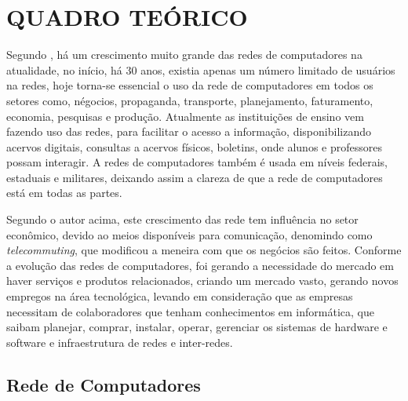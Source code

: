
\chapter{QUADRO TEÓRICO}


\par Segundo , há um crescimento muito grande das redes
de computadores na atualidade, no início, há 30 anos, existia apenas um número
limitado de usuários na redes, hoje torna-se essencial o uso da rede de
computadores em todos os setores como, négocios, propaganda, transporte,
planejamento, faturamento, economia, pesquisas e produção. Atualmente as
instituições de ensino vem fazendo uso das redes, para facilitar o acesso a
informação, disponibilizando acervos digitais, consultas a acervos físicos,
boletins, onde alunos e professores possam interagir. A redes de computadores
também é usada em níveis federais, estaduais e militares, deixando assim a
clareza de que a rede de computadores está em todas as partes.


\par Segundo o autor acima, este crescimento das rede tem influência no
setor econômico, devido ao meios disponíveis para comunicação, denomindo como \textit{telecommuting},
que modificou a meneira com que os negócios são feitos. Conforme a evolução das
redes de computadores, foi gerando a necessidade do mercado em haver serviços e
produtos relacionados, criando um mercado vasto, gerando novos empregos na área
tecnológica, levando em consideração que as empresas necessitam de colaboradores
que tenham conhecimentos em informática, que saibam planejar, comprar, instalar,
operar, gerenciar os sistemas de hardware e software e infraestrutura de redes e
inter-redes. 

\section{Rede de Computadores}



